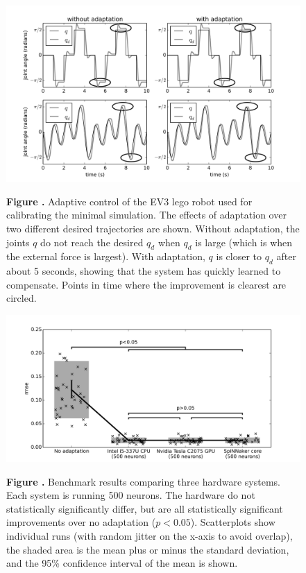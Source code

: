 \documentclass{frontiersSCNS} %
\begin{document}
\begin{figure}[h!]
\begin{center}
\includegraphics[width=18cm]{figures/fig_ev3}
\end{center}
 \textbf{\label{fig:ev3} Figure .}{ Adaptive control of the EV3 lego robot used for calibrating the minimal simulation.
 The effects of adaptation over two different desired trajectories are shown.  Without adaptation, the joints $q$ do not reach the desired $q_d$ when $q_d$ is large (which
 is when the external force is largest).  With adaptation, $q$ is closer to $q_d$ after about 5 seconds, showing that the system has quickly learned to compensate.
 Points in time where the improvement is clearest are circled.}
\end{figure}

\begin{figure}[h!]
\begin{center}
\includegraphics[width=18cm]{figures/plot_basic}
\end{center}
 \textbf{\label{fig:analysis_basic} Figure .}{ Benchmark results comparing three hardware systems.
     Each system is running 500 neurons.  The hardware do not statistically
     significantly differ, but are all statistically significant improvements 
     over no adaptation ($p<0.05$).
     Scatterplots show individual runs (with random jitter on the x-axis
     to avoid overlap), the 
     shaded area is the mean plus or minus the standard deviation, and the 95\% confidence interval of the mean is shown.}
\end{figure}
\end{document}
